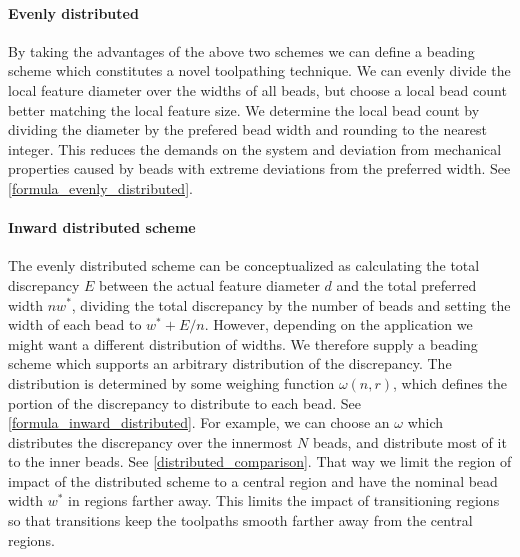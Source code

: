 \paragraph{Evenly distributed}
By taking the advantages of the above two schemes we can define a beading scheme which constitutes a novel toolpathing technique.
We can evenly divide the local feature diameter over the widths of all beads, but choose a local bead count better matching the local feature size.
We determine the local bead count by dividing the diameter by the prefered bead width and rounding to the nearest integer.
This reduces the demands on the system and deviation from mechanical properties caused by beads with extreme deviations from the preferred width.
See \cref{formula_evenly_distributed}.






\paragraph{Inward distributed scheme}
The evenly distributed scheme can be conceptualized as calculating the total discrepancy $E$ between the actual feature diameter $d$ and the total preferred width $n w^*$, dividing the total discrepancy by the number of beads and setting the width of each bead to 
$w^* + E / n$.
However, depending on the application we might want a different distribution of widths.
We therefore supply a beading scheme which supports an arbitrary distribution of the discrepancy.
The distribution is determined by some weighing function $\omega(n,r)$, which defines the portion of the discrepancy to distribute to each bead.
See \cref{formula_inward_distributed}.
For example, we can choose an $\omega$ which distributes the discrepancy over the innermost $N$ beads, and distribute most of it to the inner beads.
See \cref{distributed_comparison}.
That way we limit the region of impact of the distributed scheme to a central region and have the nominal bead width $w^*$ in regions farther away.
This limits the impact of transitioning regions so that transitions keep the toolpaths smooth farther away from the central regions. %






